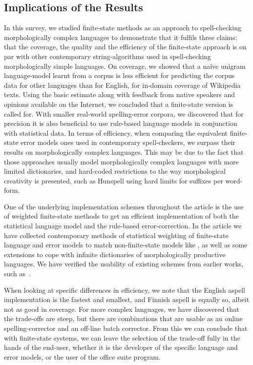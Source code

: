 \documentclass[a4paper,12pt]{article}
\begin{document}
\subsection{Implications of the Results}

In this survey, we studied finite-state methods as an approach to
spell-checking morphologically complex languages to demonstrate that it fulfils three claims:
that the coverage, the quality and the efficiency of the finite-state approach is 
on par with other contemporary string-algorithms used in spell-checking
morphologically simple languages. On coverage, we showed
that a naïve unigram language-model learnt from a corpus is less efficient for
predicting the corpus data for other languages than for English, for in-domain
coverage of Wikipedia texts. Using the basic estimate along with feedback
from native speakers and opinions available on the Internet,
we concluded that a finite-state version is called for. With smaller real-world
spelling-error corpora, we discovered that for precision it is also beneficial
to use rule-based language models in conjunction with statistical data.
In terms of efficiency, when comparing the equivalent finite-state error models 
ones used in contemporary spell-checkers, we surpass their results on
morphologically complex languages. This may be due to the fact that those
approaches usually model morphologically complex languages with more limited
dictionaries, and hard-coded restrictions to the way morphological creativity is
presented, such as Hunspell using hard limits for suffixes per word-form.

One of the underlying implementation schemes throughout the article is the use
of weighted finite-state methods to get an efficient implementation of both the
statistical language model and the rule-based error-correction. In the article
we have collected contemporary methods of statistical weighting of
finite-state language and error models to match non-finite-state models
like \cite{church1991probability}, as well as some extensions to cope with infinite
dictionaries of morphologically productive languages. We have verified the
usability of existing schemes from earlier works, such
as~\cite{pirinen/2009/nodalida,pirinen/2010/lrec}.

When looking at specific differences in efficiency, we note that the English aspell
implementation is the fastest and smallest, and Finnish aspell is equally so,
albeit not as good in coverage. For more complex
languages, we have discovered that the trade-offs are steep, but there are
combinations that are usable as an online spelling-corrector and an off-line batch
corrector. From this we can conclude that with finite-state systems, we can
leave the selection of the trade-off fully in the hands of the end-user,
whether it is the developer of the specific language and error models, or the
user of the office suite program.
\end{document}
